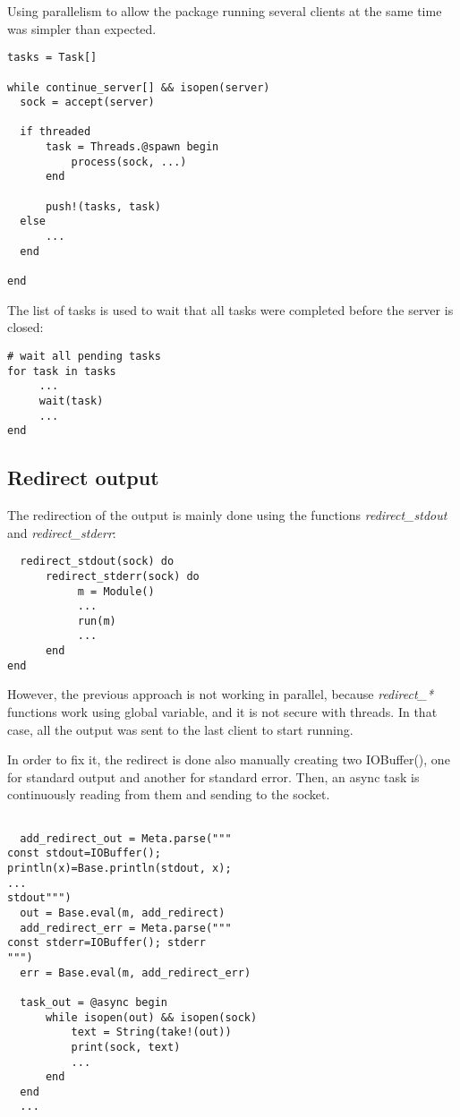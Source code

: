 \documentclass{juliacon}
\begin{document}
Using parallelism to allow the package running several clients at the same time was
simpler  than expected. 

\begin{lstlisting}
tasks = Task[]

while continue_server[] && isopen(server)
  sock = accept(server)

  if threaded
      task = Threads.@spawn begin
          process(sock, ...)
      end

      push!(tasks, task)
  else
      ...    
  end

end
\end{lstlisting}

The list of tasks is used to wait that all  tasks were completed before the
server is closed:

\begin{lstlisting}
# wait all pending tasks
for task in tasks
     ...
     wait(task)
     ...
end
\end{lstlisting}

\subsection{Redirect output}
\label{sec:output}

The redirection of the output  is mainly done using the functions
\textit{redirect\_stdout} and \textit{redirect\_stderr}:

\begin{lstlisting}
  redirect_stdout(sock) do
      redirect_stderr(sock) do
           m = Module()
           ...
           run(m)
           ...
      end
end
\end{lstlisting}

However, the previous approach is not working in parallel, because \textit{redirect\_*}
functions work using global variable, and it is not secure with threads. In that
case, all the output was sent to the last client to start running. 

In order to fix it, the redirect is done also manually creating two IOBuffer(), one
for standard output and another for standard error. Then, an async task is
continuously reading from them and sending to the socket.

\begin{lstlisting}

  add_redirect_out = Meta.parse("""
const stdout=IOBuffer();
println(x)=Base.println(stdout, x);
...
stdout""")
  out = Base.eval(m, add_redirect)
  add_redirect_err = Meta.parse("""
const stderr=IOBuffer(); stderr
""")
  err = Base.eval(m, add_redirect_err)

  task_out = @async begin
      while isopen(out) && isopen(sock)
          text = String(take!(out))
          print(sock, text)
          ...
      end
  end
  ...
\end{lstlisting}
\end{document}
